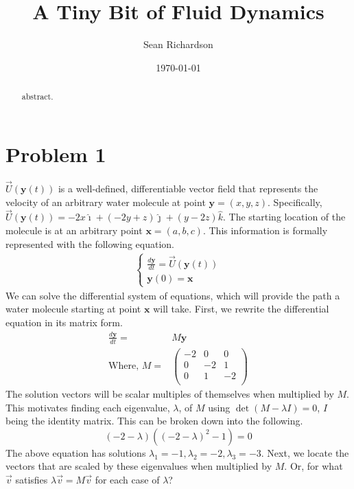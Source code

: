 \documentclass[a4paper]{article}
\title{A Tiny Bit of Fluid Dynamics}
\author{Sean Richardson}
\date{\today}
\begin{document}
\maketitle

\begin{abstract}
abstract.
\end{abstract}

\section{Problem 1}
$\vec{U}(\mathbf{y}(t))$ is a well-defined, differentiable vector field that represents the velocity of an arbitrary water molecule at point $\textbf{y}=(x,y,z)$. Specifically,
$\vec{U}(\mathbf{y}(t)) = -2x\hat{\imath} + (-2y+z)\hat{\jmath} + (y-2z)\hat{k}$. The starting location of the molecule is at an arbitrary point $\mathbf{x}=(a,b,c)$. This information is formally represented with the following equation.
\begin{align*}
	\begin{cases}
	\frac{d\mathbf{y}}{dt} = \vec{U}(\mathbf{y}(t)) \\ %
	\mathbf{y}(0) = \textbf{x}
	\end{cases}
\end{align*}
We can solve the differential system of equations, which will provide the path a water molecule starting at point $\textbf{x}$ will take. First, we rewrite the differential equation in its matrix form.
\begin{align*}
    \frac{d\mathbf{y}}{dt} =& M\mathbf{y} \\
    \text{Where, } M =& \begin{pmatrix}
    -2 & 0 & 0 \\
    0 & -2 & 1 \\
    0 & 1 & -2 \\
    \end{pmatrix}
\end{align*}
The solution vectors will be scalar multiples of themselves when multiplied by $M$. This motivates finding each eigenvalue, $\lambda$, of $M$ using $\det{(M-\lambda I)}=0$, $I$ being the identity matrix. This can be broken down into the following.
\begin{equation*}
	(-2-\lambda)((-2-\lambda)^2-1) = 0
\end{equation*}
The above equation has solutions $\lambda_1=-1, \lambda_2=-2, \lambda_3=-3$. Next, we locate the vectors that are scaled by these eigenvalues when multiplied by $M$. Or, for what $\vec{v}$ satisfies $\lambda \vec{v} = M\vec{v}$ for each case of $\lambda$?
\end{document}
